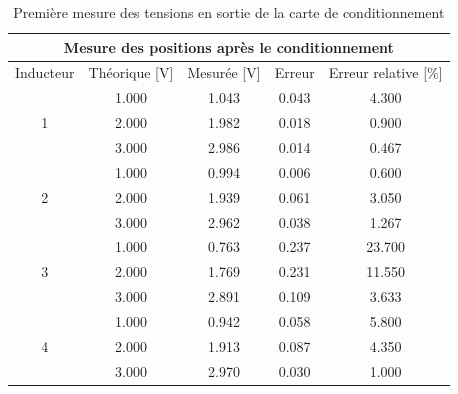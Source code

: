 \begin{table}[H]
    \centering
    \begin{tabular}{|c|c|c|c|c|}
        \hline
        \multicolumn{5}{|c|}{\textbf{Mesure des positions après le conditionnement}}                 \\ \hline
        Inducteur          & Théorique {[}V{]} & Mesurée {[}V{]} & Erreur & Erreur relative {[}\%{]} \\ \hline
        \multirow{3}{*}{1} & 1.000             & 1.043           & 0.043  & 4.300                    \\ \cline{2-5}
                           & 2.000             & 1.982           & 0.018  & 0.900                    \\ \cline{2-5}
                           & 3.000             & 2.986           & 0.014  & 0.467                    \\ \hline
        \multirow{3}{*}{2} & 1.000             & 0.994           & 0.006  & 0.600                    \\ \cline{2-5}
                           & 2.000             & 1.939           & 0.061  & 3.050                    \\ \cline{2-5}
                           & 3.000             & 2.962           & 0.038  & 1.267                    \\ \hline
        \multirow{3}{*}{3} & 1.000             & 0.763           & 0.237  & 23.700                   \\ \cline{2-5}
                           & 2.000             & 1.769           & 0.231  & 11.550                   \\ \cline{2-5}
                           & 3.000             & 2.891           & 0.109  & 3.633                    \\ \hline
        \multirow{3}{*}{4} & 1.000             & 0.942           & 0.058  & 5.800                    \\ \cline{2-5}
                           & 2.000             & 1.913           & 0.087  & 4.350                    \\ \cline{2-5}
                           & 3.000             & 2.970           & 0.030  & 1.000                    \\ \hline
    \end{tabular}
    \caption{Première mesure des tensions en sortie de la carte de conditionnement}
    \label{tab:premier_mesure_pos_cond}
\end{table}

